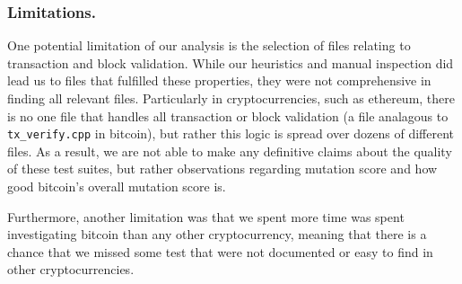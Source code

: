 \subsubsection*{Limitations.} One potential limitation of our analysis is the selection of files relating to transaction and block validation. While our heuristics and manual inspection did lead us to files that fulfilled these
properties, they were not comprehensive in finding all relevant files. Particularly in cryptocurrencies, such as ethereum, there is no one file that handles all transaction or block validation (a file analagous
to {\tt tx\_verify.cpp}  in bitcoin), but rather this logic is spread over dozens of different files. As a result, we are not able to make any definitive claims about the quality of these test suites, but rather
observations regarding mutation score and how good bitcoin's overall mutation score is.

Furthermore, another limitation was that we spent more time was spent investigating bitcoin than any other cryptocurrency, meaning that there is a chance that we missed
some test that were not documented or easy to find in other cryptocurrencies.
